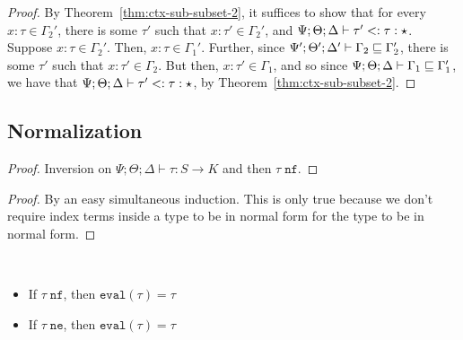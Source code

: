 \ctxsubswap*
\begin{proof}
By Theorem~\ref{thm:ctx-sub-subset-2}, it suffices to show that for every $x : \tau \in \Gamma_2'$, there is some $\tau'$ such that $x : \tau' \in \Gamma_2'$,
and $\Psi ; \Theta ; \Delta \vdash \tau' <: \tau : \star$. Suppose $x : \tau \in \Gamma_2'$. Then, $x : \tau \in \Gamma_1'$. Further, since $\Psi' ; \Theta' ;  \Delta' \vdash \Gamma_2 \sqsubseteq \Gamma_2'$, there is some $\tau'$ such that $x : \tau' \in \Gamma_2$. But then, $x : \tau' \in \Gamma_1$, and so since  $\Psi ; \Theta ; \Delta \vdash \Gamma_1 \sqsubseteq \Gamma_1'$, we have that $\Psi ; \Theta ; \Delta \vdash \tau' <: \tau : \star$, by Theorem~\ref{thm:ctx-sub-subset-2}.
\end{proof}

\subsection{Normalization}

\canonforms*
\begin{proof}
Inversion on $\Psi ;\Theta ; \Delta \vdash \tau : S \to K$  and then $\tau \; \texttt{nf}$.
\end{proof}

\idxsubstnf*
\begin{proof}
By an easy simultaneous induction. This is only true because we don't require index terms inside a type to be in normal form for the type to be in normal form.
\end{proof}

\idxsubsteval*


\normthm*

\begin{theorem}
~\begin{itemize}
  \item If $\tau \; \texttt{nf}$, then $\texttt{eval}(\tau) = \tau$
  \item If $\tau \; \texttt{ne}$, then $\texttt{eval}(\tau) = \tau$
\end{itemize}
\label{thm:norm-idemp}
\end{theorem}



